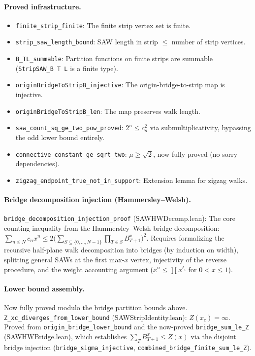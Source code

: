 \paragraph{Proved infrastructure.}
\begin{itemize}
  \item \texttt{finite\_strip\_finite}: The finite strip vertex set is finite.
  \item \texttt{strip\_saw\_length\_bound}: SAW length in strip $\leq$ number of strip vertices.
  \item \texttt{B\_TL\_summable}: Partition functions on finite strips are summable
    (\texttt{StripSAW\_B T L} is a finite type).
  \item \texttt{originBridgeToStripB\_injective}: The origin-bridge-to-strip map is injective.
  \item \texttt{originBridgeToStripB\_len}: The map preserves walk length.
  \item \texttt{saw\_count\_sq\_ge\_two\_pow\_proved}: $2^n \leq c_n^2$ via
    submultiplicativity, bypassing the odd lower bound entirely.
  \item \texttt{connective\_constant\_ge\_sqrt\_two}: $\mu \geq \sqrt{2}$,
    now fully proved (no sorry dependencies).
  \item \texttt{zigzag\_endpoint\_true\_not\_in\_support}: Extension lemma
    for zigzag walks.
\end{itemize}

\paragraph{Bridge decomposition injection (Hammersley--Welsh).}
\texttt{bridge\_decomposition\_injection\_proof} (SAWHWDecomp.lean):
The core counting inequality from the Hammersley--Welsh bridge
decomposition:
$\sum_{n \leq N} c_n x^n \leq 2 \big(\sum_{S \subseteq \{0,\ldots,N-1\}}
\prod_{T \in S} B_{T+1}^x\big)^2$.
Requires formalizing the recursive half-plane walk decomposition into
bridges (by induction on width), splitting general SAWs at the first
max-$x$ vertex, injectivity of the reverse procedure, and the weight
accounting argument ($x^n \leq \prod x^{\ell_i}$ for $0 < x \leq 1$).

\paragraph{Lower bound assembly.}
Now fully proved modulo the bridge partition bounds above.
\texttt{Z\_xc\_diverges\_from\_lower\_bound} (SAWStripIdentity.lean): $Z(x_c) = \infty$.
Proved from \texttt{origin\_bridge\_lower\_bound} and the now-proved
\texttt{bridge\_sum\_le\_Z} (SAWHWBridge.lean), which establishes
$\sum_T B_{T+1}^x \leq Z(x)$ via the disjoint bridge injection
(\texttt{bridge\_sigma\_injective}, \texttt{combined\_bridge\_finite\_sum\_le\_Z}).

